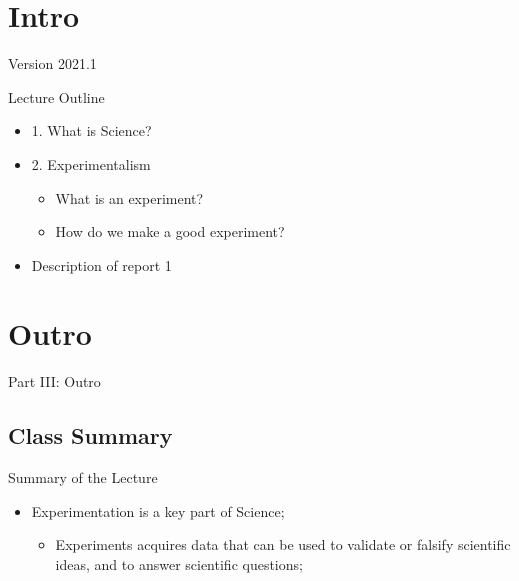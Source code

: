 \documentclass{beamer}
\subtitle[Experimentalism]{Topic 01 - What is an experiment?}
\begin{document}
\begin{CJK}{UTF8}{ipxm}

\section{Intro}
\begin{frame}
  \maketitle

  \vfill

  \hfill Version 2021.1
\end{frame}

\begin{frame}{Lecture Outline}
  \begin{itemize}
    \item 1. What is Science?\bigskip

    \item 2. Experimentalism
    \begin{itemize}
      \item What is an experiment?
      \item How do we make a good experiment?
    \end{itemize}\bigskip

    \item Description of report 1
  \end{itemize}
\end{frame}




\section{Outro}

\begin{frame}
  \begin{center}
    Part III: Outro
  \end{center}
\end{frame}

\subsection{Class Summary}
\begin{frame}{Summary of the Lecture}
  \begin{itemize}
    \item Experimentation is a key part of Science;
    \begin{itemize}
      \item Experiments acquires data that can be used to validate or falsify scientific ideas, and to answer scientific questions;
    \end{itemize}
    \bigskip


\end{itemize}
\end{frame}
\end{CJK}
\end{document}
